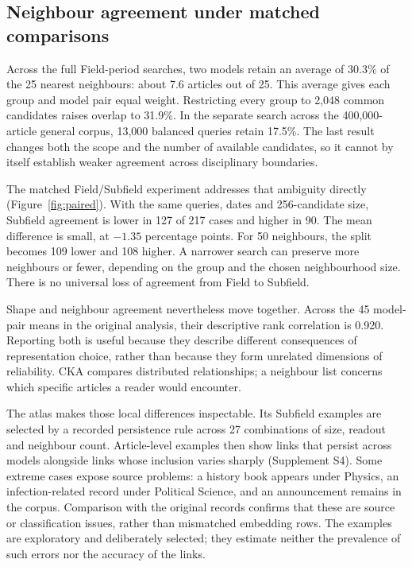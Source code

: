 \documentclass[12pt]{article}
\begin{document}
\subsection{Neighbour agreement under matched comparisons}
Across the full Field-period searches, two models retain an average of 30.3\% of the 25 nearest neighbours: about 7.6 articles out of 25. This average gives each group and model pair equal weight. Restricting every group to 2,048 common candidates raises overlap to 31.9\%. In the separate search across the 400,000-article general corpus, 13,000 balanced queries retain 17.5\%. The last result changes both the scope and the number of available candidates, so it cannot by itself establish weaker agreement across disciplinary boundaries.

The matched Field/Subfield experiment addresses that ambiguity directly (Figure~\ref{fig:paired}). With the same queries, dates and 256-candidate size, Subfield agreement is lower in 127 of 217 cases and higher in 90. The mean difference is small, at $-1.35$ percentage points. For 50 neighbours, the split becomes 109 lower and 108 higher. A narrower search can preserve more neighbours or fewer, depending on the group and the chosen neighbourhood size. There is no universal loss of agreement from Field to Subfield.

Shape and neighbour agreement nevertheless move together. Across the 45 model-pair means in the original analysis, their descriptive rank correlation is 0.920. Reporting both is useful because they describe different consequences of representation choice, rather than because they form unrelated dimensions of reliability. CKA compares distributed relationships; a neighbour list concerns which specific articles a reader would encounter.

The atlas makes those local differences inspectable. Its Subfield examples are selected by a recorded persistence rule across 27 combinations of size, readout and neighbour count. Article-level examples then show links that persist across models alongside links whose inclusion varies sharply (Supplement S4). Some extreme cases expose source problems: a history book appears under Physics, an infection-related record under Political Science, and an announcement remains in the corpus. Comparison with the original records confirms that these are source or classification issues, rather than mismatched embedding rows. The examples are exploratory and deliberately selected; they estimate neither the prevalence of such errors nor the accuracy of the links.
\end{document}
